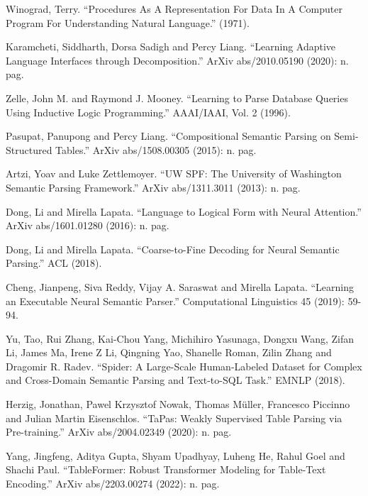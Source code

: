 \documentclass[11pt,dvipdfm]{article}
\begin{document}
\begin{thebibliography}{10}
\itemsep=1pt
\begin{small}

 Winograd, Terry. “Procedures As A Representation For Data In A Computer Program For Understanding Natural Language.” (1971).

 Karamcheti, Siddharth, Dorsa Sadigh and Percy Liang. “Learning Adaptive Language Interfaces through Decomposition.” ArXiv abs/2010.05190 (2020): n. pag.

 Zelle, John M. and Raymond J. Mooney. “Learning to Parse Database Queries Using Inductive Logic Programming.” AAAI/IAAI, Vol. 2 (1996).

 Pasupat, Panupong and Percy Liang. “Compositional Semantic Parsing on Semi-Structured Tables.” ArXiv abs/1508.00305 (2015): n. pag.

 Artzi, Yoav and Luke Zettlemoyer. “UW SPF: The University of Washington Semantic Parsing Framework.” ArXiv abs/1311.3011 (2013): n. pag.

 Dong, Li and Mirella Lapata. “Language to Logical Form with Neural Attention.” ArXiv abs/1601.01280 (2016): n. pag.

 Dong, Li and Mirella Lapata. “Coarse-to-Fine Decoding for Neural Semantic Parsing.” ACL (2018).

 Cheng, Jianpeng, Siva Reddy, Vijay A. Saraswat and Mirella Lapata. “Learning an Executable Neural Semantic Parser.” Computational Linguistics 45 (2019): 59-94.

 Yu, Tao, Rui Zhang, Kai-Chou Yang, Michihiro Yasunaga, Dongxu Wang, Zifan Li, James Ma, Irene Z Li, Qingning Yao, Shanelle Roman, Zilin Zhang and Dragomir R. Radev. “Spider: A Large-Scale Human-Labeled Dataset for Complex and Cross-Domain Semantic Parsing and Text-to-SQL Task.” EMNLP (2018).

 Herzig, Jonathan, Pawel Krzysztof Nowak, Thomas Müller, Francesco Piccinno and Julian Martin Eisenschlos. “TaPas: Weakly Supervised Table Parsing via Pre-training.” ArXiv abs/2004.02349 (2020): n. pag.

 Yang, Jingfeng, Aditya Gupta, Shyam Upadhyay, Luheng He, Rahul Goel and Shachi Paul. “TableFormer: Robust Transformer Modeling for Table-Text Encoding.” ArXiv abs/2203.00274 (2022): n. pag.


\end{small}
\end{thebibliography}
\end{document}
